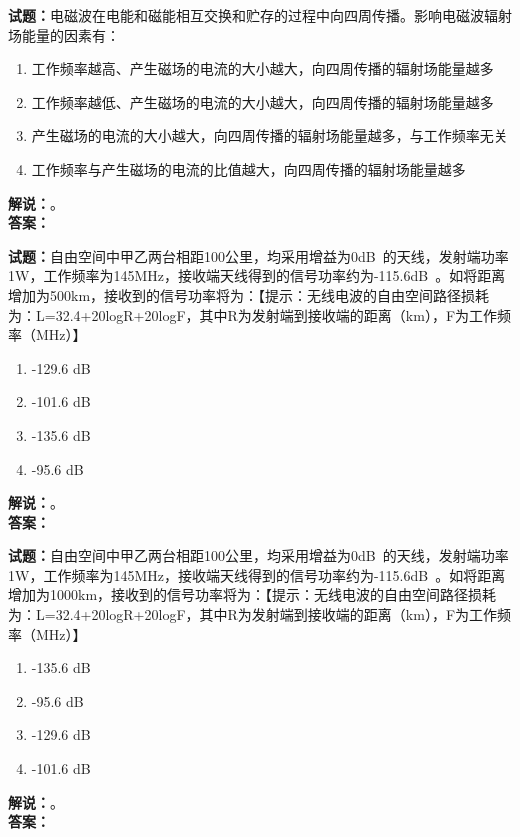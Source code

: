 \documentclass{ctexbook}
\begin{document}
\bigskip

\noindent\textbf{试题：}电磁波在电能和磁能相互交换和贮存的过程中向四周传播。影响电磁波辐射场能量的因素有：
\begin{enumerate}[leftmargin=3em]
  \item 工作频率越高、产生磁场的电流的大小越大，向四周传播的辐射场能量越多
  \item 工作频率越低、产生磁场的电流的大小越大，向四周传播的辐射场能量越多
  \item 产生磁场的电流的大小越大，向四周传播的辐射场能量越多，与工作频率无关
  \item 工作频率与产生磁场的电流的比值越大，向四周传播的辐射场能量越多
\end{enumerate}
\noindent\textbf{解说：}\textbf{}。\\\noindent\textbf{答案：}

\bigskip

\noindent\textbf{试题：}自由空间中甲乙两台相距100公里，均采用增益为0\unit[qualifier-mode=combine]{\deci\bel{}}的天线，发射端功率1W，工作频率为145\unit{\MHz}，接收端天线得到的信号功率约为-115.6\unit[qualifier-mode=combine]{\deci\bel{}}。如将距离增加为500km，接收到的信号功率将为：【提示：无线电波的自由空间路径损耗为：L=32.4+20logR+20logF，其中R为发射端到接收端的距离（km），F为工作频率（\unit{\MHz}）】
\begin{enumerate}[leftmargin=3em]
  \item -129.6 \unit[qualifier-mode=combine]{\deci\bel{}}
  \item -101.6 \unit[qualifier-mode=combine]{\deci\bel{}}
  \item -135.6 \unit[qualifier-mode=combine]{\deci\bel{}}
  \item -95.6 \unit[qualifier-mode=combine]{\deci\bel{}}
\end{enumerate}
\noindent\textbf{解说：}\textbf{}。\\\noindent\textbf{答案：}

\bigskip

\noindent\textbf{试题：}自由空间中甲乙两台相距100公里，均采用增益为0\unit[qualifier-mode=combine]{\deci\bel{}}的天线，发射端功率1W，工作频率为145\unit{\MHz}，接收端天线得到的信号功率约为-115.6\unit[qualifier-mode=combine]{\deci\bel{}}。如将距离增加为1000km，接收到的信号功率将为：【提示：无线电波的自由空间路径损耗为：L=32.4+20logR+20logF，其中R为发射端到接收端的距离（km），F为工作频率（\unit{\MHz}）】
\begin{enumerate}[leftmargin=3em]
  \item -135.6 \unit[qualifier-mode=combine]{\deci\bel{}}
  \item -95.6 \unit[qualifier-mode=combine]{\deci\bel{}}
  \item -129.6 \unit[qualifier-mode=combine]{\deci\bel{}}
  \item -101.6 \unit[qualifier-mode=combine]{\deci\bel{}}
\end{enumerate}
\noindent\textbf{解说：}\textbf{}。\\\noindent\textbf{答案：}
\end{document}
